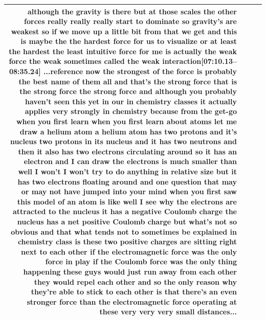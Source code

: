 \documentclass[10pt]{article}
\begin{document}
\begin{tiny}
\begin{longtable}{|r|p{0.375in}|p{1.275in}|p{3.5in}|}
although the gravity is there but at those scales the other forces really really really start to dominate so gravity's are weakest so if we move up a little bit from that we get and this is maybe the the hardest force for us to visualize or at least the hardest the least intuitive force for me is actually the weak force the weak sometimes called the weak interaction\newline\textbf{[07:10.13--08:35.24]} ...reference now the strongest of the force is probably the best name of them all and that's the strong force that is the strong force the strong force and although you probably haven't seen this yet in our in chemistry classes it actually applies very strongly in chemistry because from the get-go when you first learn when you first learn about atoms let me draw a helium atom a helium atom has two protons and it's nucleus two protons in its nucleus and it has two neutrons and then it also has two electrons circulating around so it has an electron and I can draw the electrons is much smaller than well I won't I won't try to do anything in relative size but it has two electrons floating around and one question that may or may not have jumped into your mind when you first saw this model of an atom is like well I see why the electrons are attracted to the nucleus it has a negative Coulomb charge the nucleus has a net positive Coulomb charge but what's not so obvious and that what tends not to sometimes be explained in chemistry class is these two positive charges are sitting right next to each other if the electromagnetic force was the only force in play if the Coulomb force was the only thing happening these guys would just run away from each other they would repel each other and so the only reason why they're able to stick to each other is that there's an even stronger force than the electromagnetic force operating at these very very very small distances... \\\hline

\end{longtable}
\end{tiny}
\end{document}
